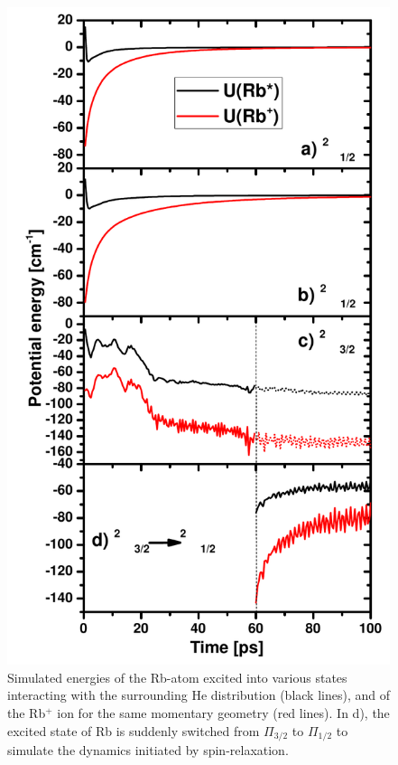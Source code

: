 \begin{figure}[!]
	\includegraphics[width=1.0\linewidth,clip=true]{fig9}
	\caption{\label{fig:Ustar} Simulated energies of the Rb-atom excited into various states interacting with the surrounding He distribution (black lines), and of the Rb$^+$ ion for the same momentary geometry (red lines). In d), the excited state of Rb is suddenly switched from $\Pi_{3/2}$ to $\Pi_{1/2}$ to simulate the dynamics initiated by spin-relaxation.}
\end{figure}

